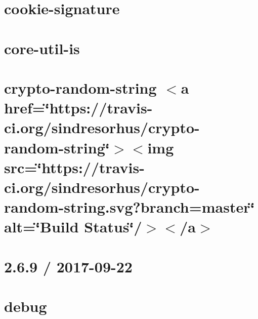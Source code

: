 \let\mypdfximage\pdfximage\def\pdfximage{\immediate\mypdfximage}\documentclass[twoside]{book}
\newcommand{\+}{\discretionary{\mbox{\scriptsize$\hookleftarrow$}}{}{}}
\begin{document}
\chapter{cookie-\/signature}
\label{md__c_1__git_hub__p_r_o_y_e_c_t_o-_i_i_i-_g_o_t_rest-api_node_modules_cookie-signature__readme}

\chapter{core-\/util-\/is}
\label{md__c_1__git_hub__p_r_o_y_e_c_t_o-_i_i_i-_g_o_t_rest-api_node_modules_core-util-is__r_e_a_d_m_e}

\chapter{crypto-\/random-\/string $<$a href=\char`\"{}https\+://travis-\/ci.\+org/sindresorhus/crypto-\/random-\/string\char`\"{}$>$$<$img src=\char`\"{}https\+://travis-\/ci.\+org/sindresorhus/crypto-\/random-\/string.\+svg?branch=master\char`\"{} alt=\char`\"{}\+Build Status\char`\"{}/$>$$<$/a$>$}
\label{md__c_1__git_hub__p_r_o_y_e_c_t_o-_i_i_i-_g_o_t_rest-api_node_modules_crypto-random-string_readme}

\chapter{2.6.9 / 2017-\/09-\/22}
\label{md__c_1__git_hub__p_r_o_y_e_c_t_o-_i_i_i-_g_o_t_rest-api_node_modules_debug__c_h_a_n_g_e_l_o_g}

\chapter{debug}
\label{md__c_1__git_hub__p_r_o_y_e_c_t_o-_i_i_i-_g_o_t_rest-api_node_modules_debug__r_e_a_d_m_e}

\end{document}
